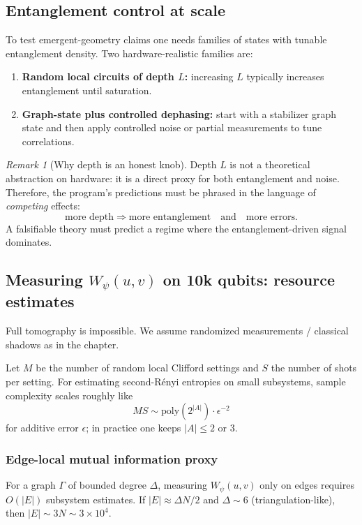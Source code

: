 \documentclass[11pt,oneside]{amsbook}
\numberwithin{equation}{section}
\theoremstyle{plain}
\theoremstyle{definition}
\theoremstyle{remark}
\newtheorem{remark}[theorem]{Remark}
\begin{document}
\subsection{Entanglement control at scale}
\label{sec:entanglement_control}

To test emergent-geometry claims one needs families of states with tunable entanglement density.
Two hardware-realistic families are:

\begin{enumerate}
\item \textbf{Random local circuits of depth $L$:} increasing $L$ typically increases entanglement until saturation.
\item \textbf{Graph-state plus controlled dephasing:} start with a stabilizer graph state and then apply controlled noise or partial measurements to tune correlations.
\end{enumerate}

\begin{remark}[Why depth is an honest knob]
Depth $L$ is not a theoretical abstraction on hardware: it is a direct proxy for both entanglement and noise.
Therefore, the program's predictions must be phrased in the language of \emph{competing} effects:
\[
\text{more depth} \Rightarrow \text{more entanglement} \quad \text{and} \quad \text{more errors}.
\]
A falsifiable theory must predict a regime where the entanglement-driven signal dominates.
\end{remark}

\subsection{Measuring $W_\psi(u,v)$ on 10k qubits: resource estimates}
\label{sec:W_resources}

Full tomography is impossible.
We assume randomized measurements / classical shadows as in the  chapter.

Let $M$ be the number of random local Clifford settings and $S$ the number of shots per setting.
For estimating second-Rényi entropies on small subsystems, sample complexity scales roughly like
\[
MS \sim \mathrm{poly}(2^{|A|})\cdot \epsilon^{-2}
\]
for additive error $\epsilon$; in practice one keeps $|A|\le 2$ or $3$.

\subsubsection{Edge-local mutual information proxy}
For a graph $\Gamma$ of bounded degree $\Delta$, measuring $W_\psi(u,v)$ only on edges requires $O(|E|)$ subsystem estimates.
If $|E|\approx \Delta N/2$ and $\Delta\sim 6$ (triangulation-like), then $|E|\sim 3N\sim 3\times 10^4$.
\end{document}

